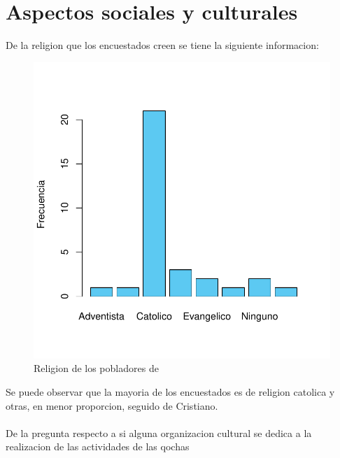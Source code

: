 \documentclass[12pt]{article}\usepackage[]{graphicx}\usepackage[]{xcolor}
\makeatletter
\def\maxwidth{ %
  \ifdim\Gin@nat@width>\linewidth
    \linewidth
  \else
    \Gin@nat@width
  \fi
}
\newenvironment{knitrout}{}{} %
\makeatother
\begin{document}
	\section{Aspectos sociales y culturales}
	De la religion que los encuestados creen se tiene la siguiente informacion:
	\begin{figure}[H]
	\centering
\begin{knitrout}
\color{fgcolor}
\includegraphics[width=\maxwidth]{figure/veintiuno-1} 
\end{knitrout}
	\caption{Religion de los pobladores de \comunidad}
	\end{figure}
	Se puede observar que la mayoria de los encuestados es de religion catolica y otras, en menor proporcion, seguido de Cristiano.\\
	\\
	De la pregunta respecto a si alguna organizacion cultural se dedica a la realizacion de las actividades de las qochas
\end{document}
